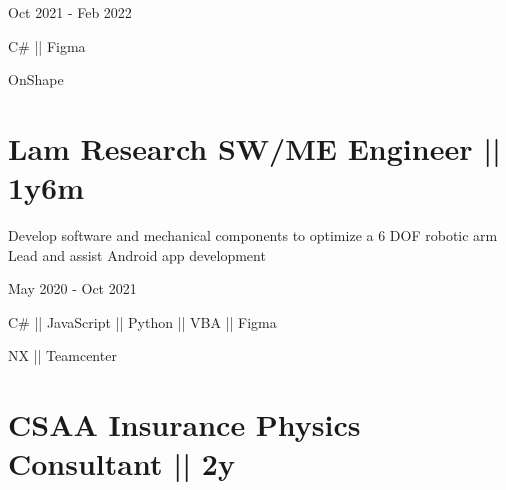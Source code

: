 \begin{subtitle}
    \vspace{-5.2ex}
    {{Oct 2021 - Feb 2022}}
\end{subtitle}

{\vspace{-2ex} \color{cyan}\small {C\# || Figma}}

{
\vspace{-2.5ex}\hspace{3.17in} \color{cyan} \small
{OnShape} }
\vspace{1ex}


\section
{\textbf{Lam Research} \newline
SW/ME Engineer || 1y6m}{}

\vspace{-2.5ex}
\begin{detail}
    \BulletItem
    Develop software and mechanical components to optimize a 6 DOF robotic arm 
    \BulletItem
    Lead and assist Android app development
\end{detail}

\begin{subtitle}
    \vspace{-7.8ex}
    {{May 2020 - Oct 2021}} 
\end{subtitle}

{ \vspace{0.5ex} \color{cyan}\small
{C\# || JavaScript || Python || VBA || Figma} }

{
\vspace{-2.5ex}\hspace{3.17in} \color{cyan} \small
{NX || Teamcenter} }
\vspace{1ex}


\section
{\textbf{CSAA Insurance} \newline
Physics Consultant || 2y}{}


